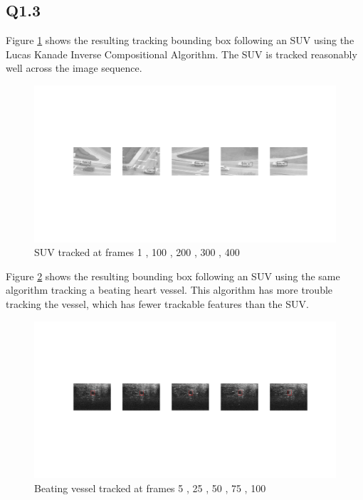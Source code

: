 \documentclass[12pt]{article}
\begin{document}
\subsection{Q1.3}

Figure \ref{fig:suv} shows the resulting tracking bounding box following an SUV using the Lucas Kanade Inverse Compositional Algorithm. The SUV is tracked reasonably well across the image sequence.

\begin{figure}[H]
\centering
\includegraphics[page=1,width=1.0\textwidth]{q13_suv}
\caption{ SUV tracked at frames 1 , 100 , 200 , 300 , 400 } 
\label{fig:suv}
\end{figure}   

Figure \ref{fig:usvessel} shows the resulting bounding box following an SUV using the same algorithm tracking a beating heart vessel. This algorithm has more trouble tracking the vessel, which has fewer trackable  features than the SUV.

\begin{figure}[H]
\centering
\includegraphics[page=1,width=1.0\textwidth]{q13_us}
\caption{ Beating vessel tracked at frames 5 , 25 , 50 , 75 , 100 } 
\label{fig:usvessel}
\end{figure}   
\end{document}
